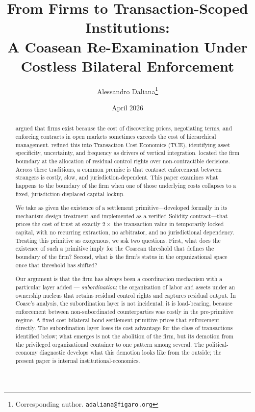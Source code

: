\documentclass[11pt,a4paper]{article}
\title{%
  From Firms to Transaction-Scoped Institutions:\\
  A Coasean Re-Examination Under Costless Bilateral Enforcement%
}
\author{
  Alessandro Daliana\thanks{Corresponding author. \texttt{adaliana@figaro.org}}
}
\date{April 2026}
\theoremstyle{definition}
\theoremstyle{remark}
\begin{document}
\maketitle

\begin{abstract}
\citet{coase1937} argued that firms exist because the cost of
discovering prices, negotiating terms, and enforcing contracts in
open markets sometimes exceeds the cost of hierarchical management.
\citet{williamson1985} refined this into Transaction Cost Economics
(TCE), identifying asset specificity, uncertainty, and frequency as
drivers of vertical integration. \citet{hart1995} located the firm
boundary at the allocation of residual control rights over
non-contractible decisions. Across these traditions, a common premise
is that contract enforcement between strangers is costly, slow, and
jurisdiction-dependent. This paper examines what happens to the
boundary of the firm when one of those underlying costs collapses to
a fixed, jurisdiction-displaced capital lockup.

We take as given the existence of a settlement
primitive---developed formally in its mechanism-design treatment
and implemented as a verified Solidity contract---that prices
the cost of trust at exactly $2\times$ the transaction value in
temporarily locked
capital, with no recurring extraction, no arbitrator, and no
jurisdictional dependency. Treating this primitive as exogenous, we
ask two questions. First, what does the existence of such a
primitive imply for the Coasean threshold that defines the boundary
of the firm? Second, what is the firm's status in the organizational
space once that threshold has shifted?

Our argument is that the firm has always been a coordination
mechanism with a particular layer added --- \emph{subordination}:
the organization of labor and assets under an ownership nucleus that
retains residual control rights and captures residual output. In
Coase's analysis, the subordination layer is not incidental; it is
load-bearing, because enforcement between non-subordinated
counterparties was costly in the pre-primitive regime. A fixed-cost
bilateral-bond settlement primitive prices that enforcement
directly. The subordination layer loses its cost advantage for the
class of transactions identified below; what emerges is not the
abolition of the firm, but its demotion from the privileged
organizational container to one pattern among several. The
political-economy diagnostic develops what this demotion looks
like from the outside; the present paper is internal
institutional-economics.
\end{abstract}
\end{document}
